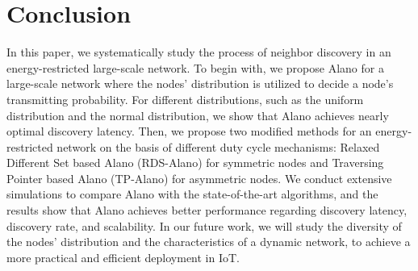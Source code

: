 \section{Conclusion}
\label{Conclusion}
In this paper, we systematically study the process of neighbor discovery
in an energy-restricted large-scale network. To begin with, we propose
Alano for a large-scale network where the nodes' distribution is utilized to
decide a node's transmitting probability. For different distributions,
such as the uniform distribution and the normal distribution, we show that Alano
achieves nearly optimal discovery latency. Then, we propose two modified
methods for an energy-restricted network on the basis of different duty
cycle mechanisms: Relaxed Different Set based Alano (RDS-Alano) for
symmetric nodes and Traversing Pointer based Alano (TP-Alano) for
asymmetric nodes. We conduct extensive simulations to compare Alano with
the state-of-the-art algorithms, and the results show that Alano achieves
better performance regarding discovery latency, discovery rate, and
scalability. In our future work, we will study the diversity of the nodes' 
distribution and the characteristics of a dynamic network,  
to achieve a more practical and efficient deployment in IoT.
